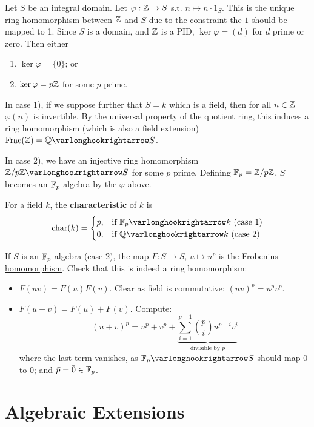 \documentclass{article}
\begin{document}
Let $S$ be an integral domain. Let $\varphi: \mathbb{Z} \to S$ s.t. $n \mapsto n \cdot 1_S$. This is the unique ring homomorphism between $\mathbb{Z}$ and $S$ due to the constraint the $1$ should be mapped to 1. Since $S$ is a domain, and $\mathbb{Z}$ is a PID, $\ker \varphi = (d)$ for $d$ prime or zero. Then either 
\begin{enumerate}[label=\arabic*)]
    \item $\ker \varphi = \{0\}$; or
    \item $\ker \varphi = p\mathbb{Z}$ for some $p$ prime.
\end{enumerate}

In case 1), if we suppose further that $S = k$ which is a field, then for all $n \in \mathbb{Z}$ $\varphi(n)$ is invertible. By the universal property of the quotient ring, this induces a ring homomorphism (which is also a field extension) $\Frac(\Z) = \Q \ext S$. 

In case 2), we have an injective ring homomorphism $\Z/p\Z \ext S$ for some $p$ prime. Defining $\mathbb{F}_p = \mathbb{Z}/p\mathbb{Z}$, $S$ becomes an $\mathbb{F}_p$-algebra by the $\varphi$ above. 

\begin{definition}[Characteristic]
    For a field $k$, the \textbf{characteristic} of $k$ is
    \[
        \fchar(k) = 
        \begin{cases}
            p, & \text{if $\F_p \ext k$ (case 1)} \\
            0, & \text{if $\Q \ext k$ (case 2)}
        \end{cases}
    \]
\end{definition}

\begin{remark}
    If $S$ is an $\mathbb{F}_p$-algebra (case 2), the map $F: S \to S$, $u \mapsto u^p$ is the \underline{Frobenius homomorphism}. Check that this is indeed a ring homomorphism:
    \begin{itemize}
        \item $F(uv) = F(u) F(v)$. Clear as field is commutative: $(uv)^p = u^p v^p$.
        \item $F(u + v) = F(u) + F(v)$. Compute: 
        \[
            (u + v)^p = u^p + v^p + \underbrace{\sum_{i = 1}^{p - 1} \binom{p}{i} u^{p-i} v^i}_{\text{divisible by $p$}}
        \]
        where the last term vanishes, as $\F_p \ext S$ should map $0$ to $0$; and $\bar{p} = \bar{0} \in \mathbb{F}_p$.
    \end{itemize}
\end{remark}

\section{Algebraic Extensions}
\end{document}
